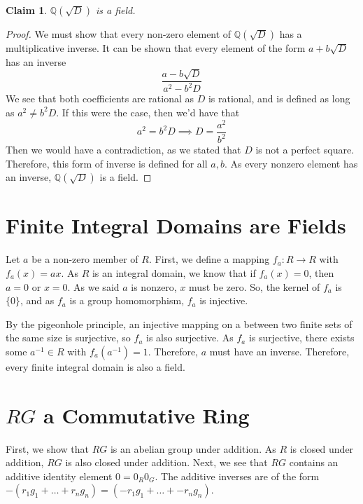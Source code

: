 \documentclass[12pt]{article}
\newtheorem*{claim*}{Claim}
\newcommand*{\inv}{^{-1}}
\begin{document}
\pagebreak
\begin{claim*}
$\mathbb{Q}(\sqrt{D})$ is a field.
\end{claim*}
\begin{proof}
We must show that every non-zero element of $\mathbb{Q}(\sqrt{D})$ has a multiplicative inverse. It can be shown that every element of the form $a + b\sqrt{D}$ has an inverse
\[\frac{a - b\sqrt{D}}{a^2 -b^2D}\]
We see that both coefficients are rational as $D$ is rational, and is defined as long as $a^2 \neq b^2D$. If this were the case, then we'd have  that
\[a^2 = b^2D \implies D = \frac{a^2}{b^2}\]
Then we would have a contradiction, as we stated that $D$ is not a perfect square. Therefore, this form of inverse is defined for all $a, b$. As every nonzero element has an inverse, $\mathbb{Q}(\sqrt{D})$ is a field.
\end{proof}

\section{Finite Integral Domains are Fields}
Let $a$ be a non-zero member of $R$. First, we define a mapping $f_a : R \rightarrow R$ with $f_a(x) = ax$. As $R$ is an integral domain, we know that if $f_a(x) = 0$, then $a = 0$ or $x = 0$. As we said $a$ is nonzero, $x$ must be zero. So, the kernel of $f_a$ is $\{0\}$, and as $f_a$ is a group homomorphism, $f_a$ is injective.

By the pigeonhole principle, an injective mapping on a between two finite sets of the same size is surjective, so $f_a$ is also surjective. As $f_a$ is surjective, there exists some $a\inv \in R$ with $f_a(a\inv) = 1$. Therefore, $a$ must have an inverse. Therefore, every finite integral domain is also a field. 
\section{$RG$ a Commutative Ring}
First, we show that $RG$ is an abelian group under addition. As $R$ is closed under addition, $RG$ is also closed under addition. Next, we see that $RG$ contains an additive identity element $0 = 0_R0_G$. The additive inverses are of the form
$-(r_1g_1 + \ldots + r_ng_n) = (-r_1g_1 + \ldots + -r_ng_n)$.
\end{document}
